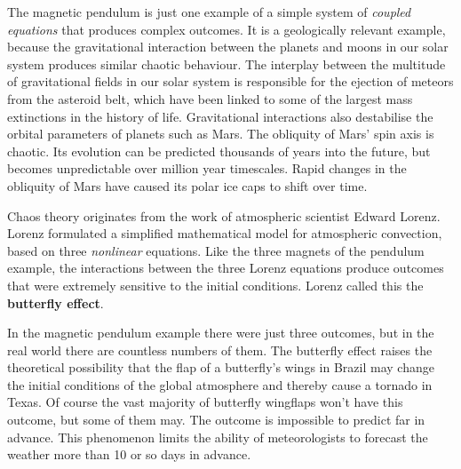 The magnetic pendulum is just one example of a simple system of
\emph{coupled equations} that produces complex outcomes. It is a
geologically relevant example, because the gravitational interaction
between the planets and moons in our solar system produces similar
chaotic behaviour.  The interplay between the multitude of
gravitational fields in our solar system is responsible for the
ejection of meteors from the asteroid belt, which have been linked to
some of the largest mass extinctions in the history of
life. Gravitational interactions also destabilise the orbital
parameters of planets such as Mars. The obliquity of Mars' spin axis
is chaotic. Its evolution can be predicted thousands of years into the
future, but becomes unpredictable over million year timescales. Rapid
changes in the obliquity of Mars have caused its polar ice caps to
shift over time.\medskip

Chaos theory originates from the work of atmospheric scientist Edward
Lorenz. Lorenz formulated a simplified mathematical model for
atmospheric convection, based on three \emph{nonlinear} equations.
Like the three magnets of the pendulum example, the interactions
between the three Lorenz equations produce outcomes that were
extremely sensitive to the initial conditions. Lorenz called this the
\textbf{butterfly effect}.\medskip

In the magnetic pendulum example there were just three outcomes, but
in the real world there are countless numbers of them. The butterfly
effect raises the theoretical possibility that the flap of a
butterfly's wings in Brazil may change the initial conditions of the
global atmosphere and thereby cause a tornado in Texas. Of course the
vast majority of butterfly wingflaps won't have this outcome, but some
of them may. The outcome is impossible to predict far in advance.
This phenomenon limits the ability of meteorologists to forecast the
weather more than 10 or so days in advance.
